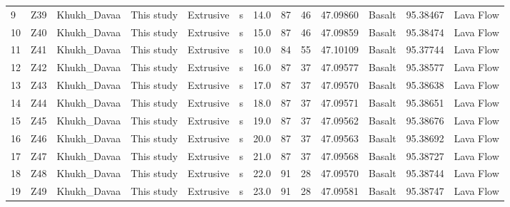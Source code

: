\documentclass[11pt]{article}
\begin{document}
\begin{sidewaystable}
{\begin{tabular}{llllllrrrrlrl}
9  &          Z39 &      Khukh\_Davaa &        This study &  Extrusive &               s &       14.0 &                        87 &              46 &  47.09860 &         Basalt &  95.38467 &  Lava Flow \\
10 &          Z40 &      Khukh\_Davaa &        This study &  Extrusive &               s &       15.0 &                        87 &              46 &  47.09859 &         Basalt &  95.38474 &  Lava Flow \\
11 &          Z41 &      Khukh\_Davaa &        This study &  Extrusive &               s &       10.0 &                        84 &              55 &  47.10109 &         Basalt &  95.37744 &  Lava Flow \\
12 &          Z42 &      Khukh\_Davaa &        This study &  Extrusive &               s &       16.0 &                        87 &              37 &  47.09577 &         Basalt &  95.38577 &  Lava Flow \\
13 &          Z43 &      Khukh\_Davaa &        This study &  Extrusive &               s &       17.0 &                        87 &              37 &  47.09570 &         Basalt &  95.38638 &  Lava Flow \\
14 &          Z44 &      Khukh\_Davaa &        This study &  Extrusive &               s &       18.0 &                        87 &              37 &  47.09571 &         Basalt &  95.38651 &  Lava Flow \\
15 &          Z45 &      Khukh\_Davaa &        This study &  Extrusive &               s &       19.0 &                        87 &              37 &  47.09562 &         Basalt &  95.38676 &  Lava Flow \\
16 &          Z46 &      Khukh\_Davaa &        This study &  Extrusive &               s &       20.0 &                        87 &              37 &  47.09563 &         Basalt &  95.38692 &  Lava Flow \\
17 &          Z47 &      Khukh\_Davaa &        This study &  Extrusive &               s &       21.0 &                        87 &              37 &  47.09568 &         Basalt &  95.38727 &  Lava Flow \\
18 &          Z48 &      Khukh\_Davaa &        This study &  Extrusive &               s &       22.0 &                        91 &              28 &  47.09570 &         Basalt &  95.38744 &  Lava Flow \\
19 &          Z49 &      Khukh\_Davaa &        This study &  Extrusive &               s &       23.0 &                        91 &              28 &  47.09581 &         Basalt &  95.38747 &  Lava Flow \\

\end{tabular}}
\end{sidewaystable}
\end{document}

